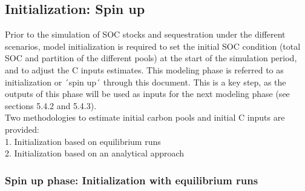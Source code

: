 \documentclass[
  10pt,
  b5paper,
]{book}
\begin{document}
\hypertarget{initialization-spin-up}{%
\subsection{Initialization: Spin up}\label{initialization-spin-up}}

Prior to the simulation of SOC stocks and sequestration under the different scenarios, model initialization is required to set the initial SOC condition (total SOC and partition of the different pools) at the start of the simulation period, and to adjust the C inputs estimates. This modeling phase is referred to as initialization or ´spin up´ through this document. This is a key step, as the outputs of this phase will be used as inputs for the next modeling phase (see sections 5.4.2 and 5.4.3).\\
Two methodologies to estimate initial carbon pools and initial C inputs are provided:\\
1. Initialization based on equilibrium runs\\
2. Initialization based on an analytical approach

\hypertarget{spin-up-phase-initialization-with-equilibrium-runs}{%
\subsubsection{Spin up phase: Initialization with equilibrium runs}\label{spin-up-phase-initialization-with-equilibrium-runs}}
\end{document}
